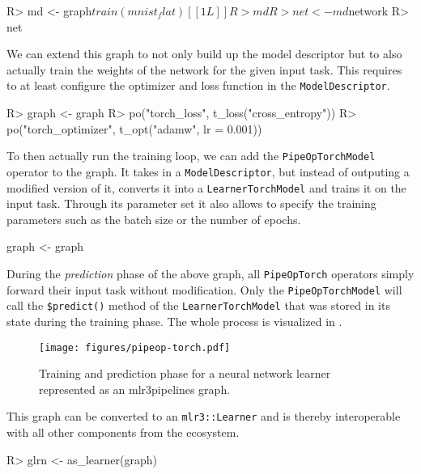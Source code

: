 \documentclass[article, nojss]{jss}
\theoremstyle{definition}
\begin{document}
\begin{CodeInput}
R> md <- graph$train(mnist_flat)[[1L]]
R> md
R> net <- md$network
R> net
\end{CodeInput}

We can extend this graph to not only build up the model descriptor but to also actually train the weights of the network for the given input task.
This requires to at least configure the optimizer and loss function in the \texttt{ModelDescriptor}.

\begin{CodeInput}
R> graph <- graph %
R>   po("torch_loss", t_loss("cross_entropy")) %
R>   po("torch_optimizer", t_opt("adamw", lr = 0.001))
\end{CodeInput}

To then actually run the training loop, we can add the \texttt{PipeOpTorchModel} operator to the graph.
It takes in a \texttt{ModelDescriptor}, but instead of outputing a modified version of it, converts it into a \texttt{LearnerTorchModel} and trains it on the input task.
Through its parameter set it also allows to specify the training parameters such as the batch size or the number of epochs.

\begin{CodeInput}
graph <- graph %
\end{CodeInput}

During the \emph{prediction} phase of the above graph, all \texttt{PipeOpTorch} operators simply forward their input task without modification.
Only the \texttt{PipeOpTorchModel} will call the \texttt{\$predict()} method of the \texttt{LearnerTorchModel} that was stored in its state during the training phase.
The whole process is visualized in .

\begin{figure}
    \centering
    \texttt{[image: figures/pipeop-torch.pdf]}
    \caption{Training and prediction phase for a neural network learner represented as an mlr3pipelines graph.}
    \label{fig:pipeop-torch}
\end{figure}

This graph can be converted to an \texttt{mlr3::Learner} and is thereby interoperable with all other components from the  ecosystem.

\begin{CodeInput}
R> glrn <- as_learner(graph)
\end{CodeInput}
\end{document}
